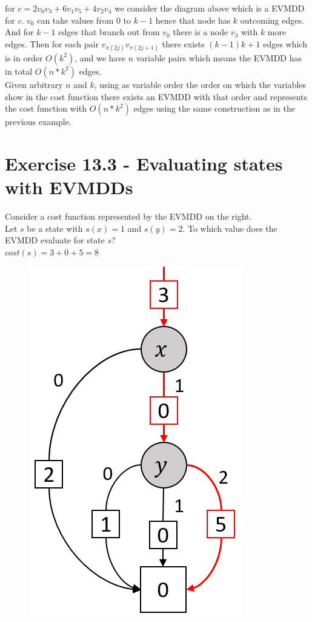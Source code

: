 \documentclass[11pt,a4paper]{article}
\begin{document}
for $c=2v_0v_3 + 6v_1v_5 + 4v_2v_4$ we consider the diagram above
which is a EVMDD for $c$. $v_0$ can take values from $0$ to $k-1$ 
hence that node has $k$ outcoming edges. And for $k-1$ edges that
branch out from $v_0$ there is a node $v_3$ with $k$ more edges.
Then for each pair $v_{\pi(2j)}v_{\pi(2j+1)}$ there exists $(k-1)k + 1$ edges
which is in order $O(k^2)$, and we have $n$ variable pairs 
which means the EVMDD has in total $O(n*k^2)$ edges.\\

Given arbitrary $n$ and $k$, using as variable order
the order on which the variables show in the cost function
there exists an EVMDD with that order and represents the cost function
with $O(n*k^2)$ edges using the same construction as in the previous example.
\section*{Exercise 13.3 - Evaluating states with EVMDDs}
Consider a cost function represented by the EVMDD on the right.\\
Let $s$ be a state with $s(x) = 1$ and $s(y) = 2$. To which value does the
EVMDD evaluate for state $s$?\\
$cost(s) = 3 + 0 + 5 = 8$
\begin{figure}[h!]
	\centering
	\includegraphics[scale=0.5]{13_3.png}
\end{figure}
\end{document}
